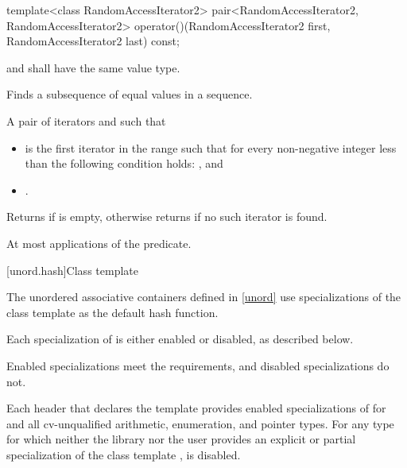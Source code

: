 %
\begin{itemdecl}
template<class RandomAccessIterator2>
  pair<RandomAccessIterator2, RandomAccessIterator2>
    operator()(RandomAccessIterator2 first, RandomAccessIterator2 last) const;
\end{itemdecl}

\begin{itemdescr}
\pnum
\requires
{} and  shall have the same value type.

\pnum
\effects
Finds a subsequence of equal values in a sequence.

\pnum
\returns
A pair of iterators  and  such that
\begin{itemize}
\item {} is the first iterator  in the range
 such that
for every non-negative integer  less than 
the following condition holds:
, and
\item {}.
\end{itemize}
Returns  if  is empty,
otherwise returns  if no such iterator is found.

\pnum
\complexity
At most  applications of the predicate.
\end{itemdescr}

[unord.hash]{Class template }

\pnum
{}%
%
The unordered associative containers defined in \ref{unord} use
specializations of the class template 
as the default hash function.

\pnum
Each specialization of  is either enabled or disabled,
as described below.
\begin{note}
Enabled specializations meet the  requirements, and
disabled specializations do not.
\end{note}
Each header that declares the template 
provides enabled specializations of  for  and
all cv-unqualified arithmetic, enumeration, and pointer types.
For any type  for which neither the library nor the user provides
an explicit or partial specialization of the class template ,
 is disabled.


